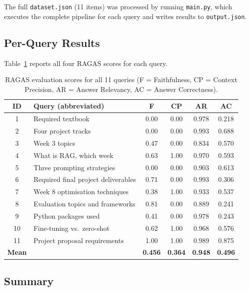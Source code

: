 \documentclass[11pt,a4paper]{article}
\begin{document}
The full \texttt{dataset.json} (11 items) was processed by running
\texttt{main.py}, which executes the complete pipeline for each query and writes
results to \texttt{output.json}.

\subsection{Per-Query Results}

Table~\ref{tab:results} reports all four RAGAS scores for each query.

\begin{table}[H]
\centering
\small
\caption{RAGAS evaluation scores for all 11 queries (F = Faithfulness,
CP = Context Precision, AR = Answer Relevancy, AC = Answer Correctness).}
\label{tab:results}
\begin{tabular}{clcccc}
\toprule
\textbf{ID} & \textbf{Query (abbreviated)} & \textbf{F} & \textbf{CP} & \textbf{AR} & \textbf{AC} \\
\midrule
1  & Required textbook            & 0.00 & 0.00 & 0.978 & 0.218 \\
2  & Four project tracks          & 0.00 & 0.00 & 0.993 & 0.688 \\
3  & Week 3 topics                & 0.47 & 0.00 & 0.834 & 0.570 \\
4  & What is RAG, which week      & 0.63 & 1.00 & 0.970 & 0.593 \\
5  & Three prompting strategies   & 0.00 & 0.00 & 0.903 & 0.613 \\
6  & Required final project deliverables & 0.71 & 0.00 & 0.993 & 0.306 \\
7  & Week 8 optimisation techniques & 0.38 & 1.00 & 0.933 & 0.537 \\
8  & Evaluation topics and frameworks & 0.81 & 0.00 & 0.889 & 0.241 \\
9  & Python packages used         & 0.41 & 0.00 & 0.978 & 0.243 \\
10 & Fine-tuning vs.\ zero-shot   & 0.62 & 1.00 & 0.968 & 0.576 \\
11 & Project proposal requirements & 1.00 & 1.00 & 0.989 & 0.875 \\
\midrule
\textbf{Mean} & & \textbf{0.456} & \textbf{0.364} & \textbf{0.948} & \textbf{0.496} \\
\bottomrule
\end{tabular}
\end{table}

\subsection{Summary}
\end{document}
